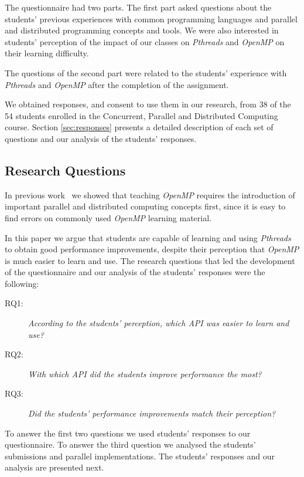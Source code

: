 The questionnaire had two parts. The first part asked questions
about the students' previous experiences with common programming languages and
parallel and distributed programming concepts and tools. We were also
interested in students' perception of the impact of our classes on
\textit{Pthreads} and \textit{OpenMP} on their learning difficulty.

The questions of the second part were related to the students'
experience with \textit{Pthreads} and \textit{OpenMP} after
the completion of the assignment.

We obtained responses, and consent to use them in our research, from 38 of the
54 students enrolled in the Concurrent, Parallel and Distributed Computing
course. Section \ref{sec:responses} presents a detailed description of
each set of questions and our analysis of the students' responses.

\subsection{Research Questions}
\label{sec:resques}

In previous work~\cite{goncalves:OpenMPNotEasy} we showed that teaching
\textit{OpenMP} requires the introduction of important parallel and distributed
computing concepts first, since it is easy to find errors on commonly used
\textit{OpenMP} learning material.

In this paper we argue that students are capable of learning and using
\textit{Pthreads} to obtain good performance improvements, despite their
perception that \textit{OpenMP} is much easier to learn and use.
The research questions that led the development of the questionnaire
and our analysis of the students' responses were the following:

\begin{description}
    \item[RQ1:] \textit{According to the students' perception, which API was
        easier to learn and use?}
    \item[RQ2:] \textit{With which API did the students improve performance the
        most?}
    \item[RQ3:] \textit{Did the students' performance improvements match their
        perception?}
\end{description}

To answer the first two questions we used students' responses to
our questionnaire. To answer the third question we analysed the
students' submissions and parallel implementations. The
students' responses and our analysis are presented next.
